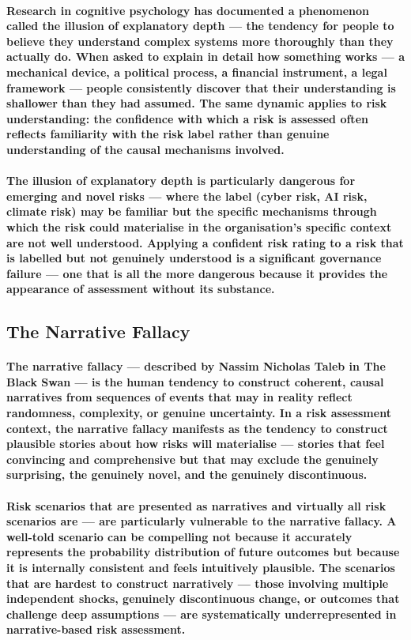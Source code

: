 \paragraph{Research in cognitive psychology has documented a phenomenon called the \textbf{illusion of explanatory depth} — the tendency for people to believe they understand complex systems more thoroughly than they actually do. When asked to explain in detail how something works — a mechanical device, a political process, a financial instrument, a legal framework — people consistently discover that their understanding is shallower than they had assumed. The same dynamic applies to risk understanding: the confidence with which a risk is assessed often reflects familiarity with the risk label rather than genuine understanding of the causal mechanisms involved.}
\paragraph{The illusion of explanatory depth is particularly dangerous for emerging and novel risks — where the label (cyber risk, AI risk, climate risk) may be familiar but the specific mechanisms through which the risk could materialise in the organisation's specific context are not well understood. Applying a confident risk rating to a risk that is labelled but not genuinely understood is a significant governance failure — one that is all the more dangerous because it provides the appearance of assessment without its substance.}

\subsection{The Narrative Fallacy}
\paragraph{The \textbf{narrative fallacy} — described by Nassim Nicholas Taleb in The Black Swan — is the human tendency to construct coherent, causal narratives from sequences of events that may in reality reflect randomness, complexity, or genuine uncertainty. In a risk assessment context, the narrative fallacy manifests as the tendency to construct plausible stories about how risks will materialise — stories that feel convincing and comprehensive but that may exclude the genuinely surprising, the genuinely novel, and the genuinely discontinuous.}
\paragraph{Risk scenarios that are presented as narratives and virtually all risk scenarios are — are particularly vulnerable to the narrative fallacy. A well-told scenario can be compelling not because it accurately represents the probability distribution of future outcomes but because it is internally consistent and feels intuitively plausible. The scenarios that are hardest to construct narratively — those involving multiple independent shocks, genuinely discontinuous change, or outcomes that challenge deep assumptions — are systematically underrepresented in narrative-based risk assessment.}

